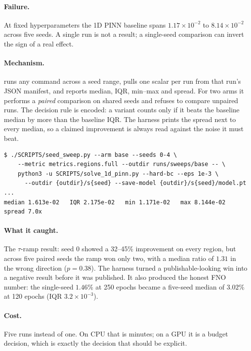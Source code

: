 \paragraph{Failure.} At fixed hyperparameters the 1D PINN baseline spans
$1.17\times10^{-2}$ to $8.14\times10^{-2}$ across five seeds. A single run is
not a result; a single-seed comparison can invert the sign of a real effect.

\paragraph{Mechanism.}  runs any command across a
seed range, pulls one scalar per run from that run's JSON manifest, and reports
median, IQR, min--max and spread. For two arms it performs a \emph{paired}
comparison on shared seeds and refuses to compare unpaired runs. The decision
rule is encoded: a variant counts only if it beats the baseline median by more
than the baseline IQR. The harness prints the spread next to every median, so a
claimed improvement is always read against the noise it must beat.

\begin{lstlisting}[caption={The harness makes the statistical rule executable.}]
$ ./SCRIPTS/seed_sweep.py --arm base --seeds 0-4 \
    --metric metrics.regions.full --outdir runs/sweeps/base -- \
    python3 -u SCRIPTS/solve_1d_pinn.py --hard-bc --eps 1e-3 \
      --outdir {outdir}/s{seed} --save-model {outdir}/s{seed}/model.pt
...
median 1.613e-02   IQR 2.175e-02   min 1.171e-02   max 8.144e-02   spread 7.0x
\end{lstlisting}

\paragraph{What it caught.} The $\tau$-ramp result: seed 0 showed a 32--45\%
improvement on every region, but across five paired seeds the ramp won only
two, with a median ratio of $1.31$ in the wrong direction ($p=0.38$). The
harness turned a publishable-looking win into a negative result before it was
published. It also produced the honest FNO number: the single-seed $1.46\%$ at
250 epochs became a five-seed median of $3.02\%$ at 120 epochs
(IQR $3.2\times10^{-3}$).

\paragraph{Cost.} Five runs instead of one. On CPU that is minutes; on a GPU it
is a budget decision, which is exactly the decision that should be explicit.

